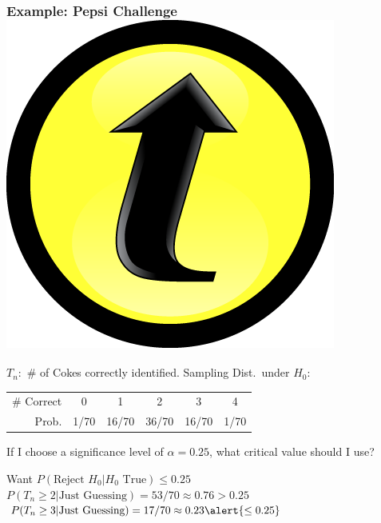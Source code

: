 \documentclass[handout]{beamer}
\begin{document}
\begin{frame}
\frametitle{Example: Pepsi Challenge \hfill \includegraphics[scale = 0.05]{./images/clicker}}
$T_n\colon$ \# of Cokes correctly identified. Sampling Dist.\ under $H_0$:
		\begin{center}
		\begin{tabular}{rccccc}
		\hline
		\# Correct & 0 & 1 & 2 & 3 & 4\\
		Prob.&1/70 & 16/70 & 36/70 & 16/70 &1/70\\
		\hline
		\end{tabular}
	\end{center}
	\alert{If I choose a significance level of $\alpha =0.25$, what critical value should I use?}
	\pause
	
	\vspace{2em}
	Want $P(\mbox{Reject } H_0|H_0 \mbox{ True})\leq 0.25$\\ \pause
	$P(T_n \geq 2 |\mbox{Just Guessing}) = 53/70 \approx 0.76 > 0.25$  \pause
	$P(T_n \geq 3 |\mbox{Just Guessing}) = 17/70 \approx 0.23 \alert{\leq 0.25}$ 
\end{frame}
\end{document}
